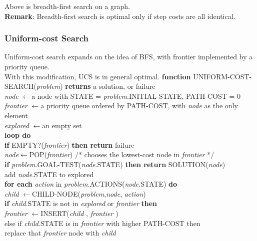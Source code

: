\documentclass[12pt]{article}
\newcommand{\ind}{\hspace*{15pt}}
\theoremstyle{definition}
\begin{document}
Above is breadth-first search on a graph.\\
\textbf{Remark}: Breadth-first search is optimal only if step costs are all identical.
\subsubsection{Uniform-cost Search}
Uniform-cost search expands on the idea of BFS, with frontier implemented by a priority queue.\\
With this modification, UCS is in general optimal.
\textbf{function} \textsc{UNIFORM-COST-SEARCH}(\textit{problem}) \textbf{returns} a solution, or failure\\
\ind \textit{node} $\leftarrow$a node with \textsc{STATE} = \textit{problem}.\textsc{INITIAL-STATE}, \textsc{PATH-COST} = 0\\
\ind \textit{frontier} $\leftarrow$a priority queue ordered by \textsc{PATH-COST}, with \textit{node} as the only element\\
\ind \textit{explored} $\leftarrow$an empty set\\
\ind \textbf{loop do}\\
\ind \ind \textbf{if} EMPTY?(\textit{frontier}) \textbf{then return} failure\\
\ind \ind \textit{node}$\leftarrow$POP(\textit{frontier}) /* chooses the lowest-cost node in \textit{frontier} */\\
\ind \ind \textbf{if} \textit{problem}.\textsc{GOAL-TEST}(\textit{node}.\textsc{STATE}) \textbf{then return} \textsc{SOLUTION}(\textit{node})\\
\ind \ind add \textit{node}.\textsc{STATE} to explored\\
\ind \ind \textbf{for each} \textit{action} in \textit{problem}.\textsc{ACTIONS}(\textit{node}.\textsc{STATE}) \textbf{do}\\
\ind \ind \ind \textit{child} $\leftarrow$\textsc{CHILD-NODE}(\textit{problem},\textit{node}, \textit{action})\\
\ind \ind \ind \textbf{if} \textit{child}.\textsc{STATE} is not in \textit{explored} or \textit{frontier} \textbf{then}\\
\ind \ind \ind \ind \textit{frontier} $\leftarrow$\textsc{INSERT}(\textit{child} , \textit{frontier} )\\
\ind \ind \ind else if \textit{child}.\textsc{STATE} is in \textit{frontier} with higher \textsc{PATH-COST} then\\
\ind \ind \ind \ind replace that \textit{frontier} node with \textit{child}\\
\end{document}

